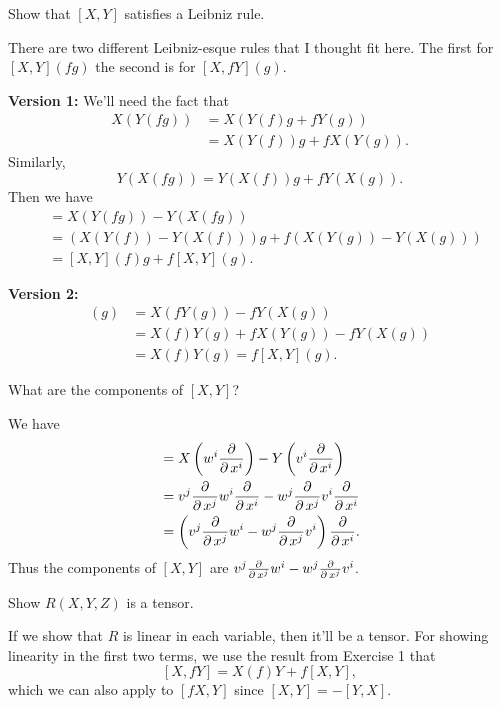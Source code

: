 \documentclass[twoside,10pt]{report}
\begin{document}

\begin{exer}[]
	Show that $[X,Y]$ satisfies a Leibniz rule.
\end{exer}

There are two different Leibniz-esque rules that I thought fit here. The first for $[X,Y](fg)$ the second is for $[X,fY](g)$.

\vspace{5mm}
\textbf{Version 1:} We'll need the fact that
\begin{align*}
	X(Y(fg)) &= X(Y(f)g+fY(g)) \\
		 &= X(Y(f))g + fX(Y(g)).
\end{align*}
Similarly,
\[
	Y(X(fg)) = Y(X(f))g + fY(X(g)).
\] Then we have
\begin{align*}
	[X,Y] &= X(Y(fg)) - Y(X(fg)) \\
	      &= \left( X(Y(f))-Y(X(f)) \right)g + f\left( X(Y(g))-Y(X(g)) \right) \\
	      &= [X,Y](f) g + f[X,Y](g).
\end{align*}

\vspace{5mm}
\textbf{Version 2:}
\begin{align*}
	[X,fY](g) &= X(fY(g)) - fY(X(g)) \\
		  &= X(f)Y(g) + fX(Y(g)) - fY(X(g)) \\
		  &= X(f)Y(g) = f[X,Y](g).
\end{align*}

\newpage
\begin{exer}[]
	What are the components of $[X,Y]$?
\end{exer}
We have
\begin{align*}
	[X,Y] &= X\left( w^{i}\frac{\p }{\p x^{i}}  \right)-Y\left( v^{i}\frac{\p }{\p x^{i}}  \right) \\
	      &= v^{j}\frac{\p }{\p x^{j}} w^{i}\frac{\p}{\p x^{i}} - w^{j}\frac{\p }{\p x^{j}} v^{i}\frac{\p }{\p x^{i}} \\
	      &= \left( v^{j} \frac{\p }{\p x^{j}}w^{i}-w^{j} \frac{\p }{\p x^{j}}v^{i} \right) \frac{\p }{\p x^{i}}.
\end{align*}
Thus the components of $[X,Y]$ are $v^{j}\frac{\operatorname{\partial} }{\operatorname{\partial} x^{j}}w^{i}-w^{j}\frac{\operatorname{\partial} }{\operatorname{\partial} x^{j}}v^{i}$.

\newpage
\begin{exer}[]
	Show $R(X,Y,Z)$ is a tensor.
\end{exer}
If we show that $R$ is linear in each variable, then it'll be a tensor. For showing linearity in the first two terms, we use the result from Exercise 1 that
\[
	[X,fY] = X(f)Y+f[X,Y],
\] which we can also apply to $[fX,Y]$ since $[X,Y]=-[Y,X]$.
\end{document}
